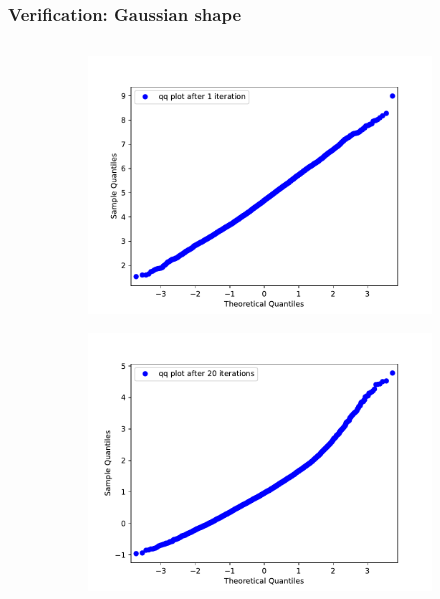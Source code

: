 \documentclass[aspectratio=169]{beamer}
\begin{document}
\begin{frame}
	\frametitle{Verification: Gaussian shape}
	\vspace{-15px}
	\begin{columns}
		\begin{column}{0.6\textwidth}
			\begin{figure}[H]
				\centering
				\begin{subfigure}[c]{0.49\textwidth}
					\includegraphics[width=\textwidth]{../imgs/harmonic_oscillator_track/track_10010000_qq_1.pdf}
				\end{subfigure}
				\begin{subfigure}[c]{0.49\textwidth}
					\includegraphics[width=\textwidth]{../imgs/harmonic_oscillator_track/track_10010000_qq_20.pdf}

\end{subfigure}
\end{figure}
\end{column}
\end{columns}
\end{frame}
\end{document}
